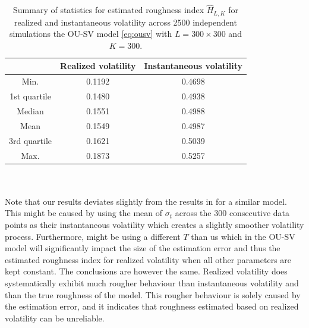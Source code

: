 \documentclass{article}
\begin{document}
\begin{table}[htbp]
    \centering
    \begin{tabular}{ccc}
        \toprule
         & Realized volatility & Instantaneous volatility \\
        \midrule
        Min. & 0.1192 & 0.4698 \\
        1st quartile & 0.1480 & 0.4938 \\
        Median & 0.1551 & 0.4988 \\
        Mean & 0.1549 & 0.4987 \\
        3rd quartile & 0.1621 & 0.5039 \\
        Max. & 0.1873 & 0.5257 \\
        \bottomrule
    \end{tabular}
    \caption{Summary of statistics for estimated roughness index $\hat{H}_{L,K}$ for realized and instantaneous volatility across 2500 independent simulations the OU-SV model \eqref{eq:ousv} with $L=300\times 300$ and $K=300$.}
    \label{tab:ex6dens}
\end{table}\\\\
Note that our results deviates slightly from the results in \cite{cont} for a similar model. This might be caused by \cite{cont} using the mean of $\sigma_t$ across the 300 consecutive data points as their instantaneous volatility which creates a slightly smoother volatility process. Furthermore, \cite{cont} might be using a different $T$ than us which in the OU-SV model will significantly impact the size of the estimation error and thus the estimated roughness index for realized volatility when all other parameters are kept constant. The conclusions are however the same. Realized volatility does systematically exhibit much rougher behaviour than instantaneous volatility and than the true roughness of the model. This rougher behaviour is solely caused by the estimation error, and it indicates that roughness estimated based on realized volatility can be unreliable.\\\\
\end{document}
